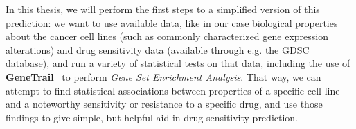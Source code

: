 In this thesis, we will perform the first steps to a simplified version of this prediction: we want to use available data, like in our case biological properties about the cancer cell lines (such as commonly characterized gene expression alterations) and drug sensitivity data (available through e.g. the \textsc{GDSC} database), and run a variety of statistical tests on that data, including the use of \textbf{GeneTrail}~\cite{genetrail} to perform \textit{Gene Set Enrichment Analysis}. That way, we can attempt to find statistical associations between properties of a specific cell line and a noteworthy sensitivity or resistance to a specific drug, and use those findings to give simple, but helpful aid in drug sensitivity prediction.%